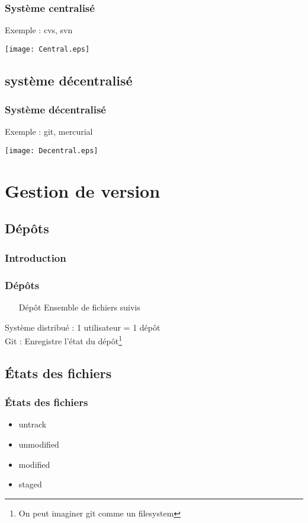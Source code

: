 \documentclass{beamer}
\begin{document}
\begin{frame}
	\frametitle{Syst\`eme centralis\'e}
	Exemple : cvs, svn
	\begin{center}
		\texttt{[image: Central.eps]}
	\end{center}
\end{frame}

\subsection{syst\`eme d\'ecentralis\'e}
\begin{frame}
	\frametitle{Syst\`eme d\'ecentralis\'e}
	Exemple : git, mercurial
	\begin{center}
		\texttt{[image: Decentral.eps]}
	\end{center}
\end{frame}

\section{Gestion de version}
\subsection{D\'ep\^ots}
\begin{frame}
	\frametitle{Introduction}
	\tableofcontents[currentsection]
\end{frame}
\begin{frame}
	\frametitle{D\'ep\^ots}
	\begin{enumerate}
		\item[D\'ep\^ot]{Ensemble de fichiers suivis}
	\end{enumerate}
	Syst\`eme distribu\'e : 1 utilisateur = 1 d\'ep\^ot\\
	Git : Enregistre l'\'etat du d\'ep\^ot\footnote{On peut imaginer git comme un filesystem}
\end{frame}

\subsection{\'Etats des fichiers} %
\begin{frame}
	\frametitle{\'Etats des fichiers}
	\begin{itemize}
		\item{untrack}
		\item{unmodified}
		\item{modified}
		\item{staged}
	\end{itemize}
\end{frame}
\end{document}
